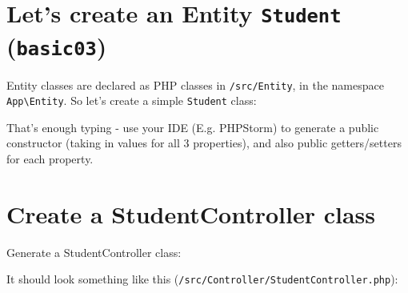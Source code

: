 \documentclass[a4paperpaper,openright]{book}
\newenvironment{Shaded}{}{}
\newcommand{\ExtensionTok}[1]{#1}
\newcommand{\KeywordTok}[1]{\textcolor[rgb]{0.00,0.44,0.13}{\textbf{#1}}}
\newcommand{\NormalTok}[1]{#1}
\newcommand{\OtherTok}[1]{\textcolor[rgb]{0.00,0.44,0.13}{#1}}
\begin{document}
\hypertarget{lets-create-an-entity-student-basic03}{%
\section{\texorpdfstring{Let's create an Entity \texttt{Student}
(\texttt{basic03})}{Let's create an Entity Student (basic03)}}\label{lets-create-an-entity-student-basic03}}

Entity classes are declared as PHP classes in \texttt{/src/Entity}, in
the namespace \texttt{App\textbackslash{}Entity}. So let's create a
simple \texttt{Student} class:

\begin{Shaded}
\end{Shaded}

That's enough typing - use your IDE (E.g. PHPStorm) to generate a public
constructor (taking in values for all 3 properties), and also public
getters/setters for each property.

\hypertarget{create-a-studentcontroller-class}{%
\section{Create a StudentController
class}\label{create-a-studentcontroller-class}}

Generate a StudentController class:

\begin{Shaded}
\end{Shaded}

It should look something like this
(\texttt{/src/Controller/StudentController.php}):
\end{document}
